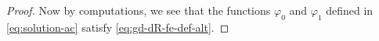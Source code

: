 \documentclass[10pt,a4paper]{amsart}
\begin{document}
\begin{proof}
Now by computations, we see that the functions $\varphi_0$ and $\varphi_1$ defined in \eqref{eq:solution-ac} satisfy \eqref{eq:gd-dR-fe-def-alt}.  
\end{proof}
\end{document}
